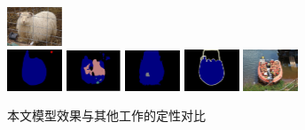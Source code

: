 \begin{figure}
\begin{subfigure}{0.55\textwidth}
		\includegraphics[width=0.18\textwidth]{figures/demo_images/result/compare/im_sheep.pdf}
		\\
		\includegraphics[width=0.18\textwidth]{figures/demo_images/result/compare/my_boat.png}
		\includegraphics[width=0.18\textwidth]{figures/demo_images/result/compare/fcn_boat.png}
		\includegraphics[width=0.18\textwidth]{figures/demo_images/result/compare/sds_boat.png}
		\includegraphics[width=0.18\textwidth]{figures/demo_images/result/compare/2007_004241.png}
		\includegraphics[width=0.18\textwidth]{figures/demo_images/result/compare/2007_004241.jpg}
		\caption{本文模型效果与其他工作的定性对比}
		\label{fig:compare1}
	\end{subfigure}
	\begin{subfigure}{0.4\textwidth}
		\centering
		

\end{subfigure}
\end{figure}
